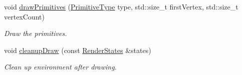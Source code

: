 \begin{DoxyCompactItemize}
void \mbox{\hyperlink{classsf_1_1_render_target_ab0a53b442b70a6f7fbc72e44005767b0}{draw\+Primitives}} (\mbox{\hyperlink{group__graphics_ga5ee56ac1339984909610713096283b1b}{Primitive\+Type}} type, std\+::size\+\_\+t first\+Vertex, std\+::size\+\_\+t vertex\+Count)
\begin{DoxyCompactList}\small\item\em Draw the primitives. \end{DoxyCompactList}\item 
void \mbox{\hyperlink{classsf_1_1_render_target_a48aa78fe0a1779fd8695a95b2a64bcea}{cleanup\+Draw}} (const \mbox{\hyperlink{classsf_1_1_render_states}{Render\+States}} \&states)
\begin{DoxyCompactList}\small\item\em Clean up environment after drawing. \end{DoxyCompactList}\end{DoxyCompactItemize}
